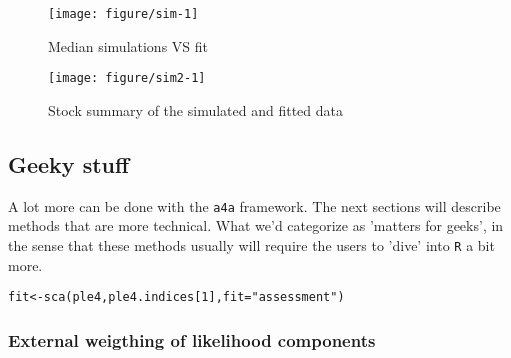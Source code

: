 \documentclass[a4paper,english,10pt]{article}\usepackage[]{graphicx}\usepackage[]{color}
\makeatletter
\def\maxwidth{ %
  \ifdim\Gin@nat@width>\linewidth
    \linewidth
  \else
    \Gin@nat@width
  \fi
}
\newcommand{\hlnum}[1]{\textcolor[rgb]{0.2,0.2,0.2}{#1}}%
\newcommand{\hlstr}[1]{\textcolor[rgb]{0.2,0.2,0.2}{#1}}%
\newcommand{\hlstd}[1]{\textcolor[rgb]{0,0,0}{#1}}%
\newcommand{\hlkwb}[1]{\textcolor[rgb]{0.361,0.506,0.596}{#1}}%
\newcommand{\hlkwc}[1]{\textcolor[rgb]{0.361,0.506,0.596}{#1}}%
\newcommand{\hlkwd}[1]{\textcolor[rgb]{0.361,0.506,0.596}{#1}}%
\newenvironment{kframe}{%
 \def\at@end@of@kframe{}%
 \ifinner\ifhmode%
  \def\at@end@of@kframe{\end{minipage}}%
  \begin{minipage}{\columnwidth}%
 \fi\fi%
 \def\FrameCommand##1{\hskip\@totalleftmargin \hskip-\fboxsep
 \colorbox{shadecolor}{##1}\hskip-\fboxsep
     \hskip-\linewidth \hskip-\@totalleftmargin \hskip\columnwidth}%
 \MakeFramed {\advance\hsize-\width
   \@totalleftmargin\z@ \linewidth\hsize
   \@setminipage}}%
 {\par\unskip\endMakeFramed%
 \at@end@of@kframe}
\newenvironment{knitrout}{}{} %
\newcommand{\initiative}[1]{{\texttt{#1}}}
\newcommand{\pkg}[1]{{\texttt{#1}}}
\makeatother
\begin{document}
\begin{knitrout}
\color{fgcolor}\begin{figure}[H]

{\centering \texttt{[image: figure/sim-1]} 

}

\caption[Median simulations VS fit]{Median simulations VS fit}\label{fig:sim}
\end{figure}


\end{knitrout}

\begin{knitrout}
\color{fgcolor}\begin{figure}[H]

{\centering \texttt{[image: figure/sim2-1]} 

}

\caption[Stock summary of the simulated and fitted data]{Stock summary of the simulated and fitted data}\label{fig:sim2}
\end{figure}


\end{knitrout}

\subsection{Geeky stuff}

A lot more can be done with the \initiative{a4a} framework. The next sections will describe methods that are more technical. What we'd categorize as 'matters for geeks', in the sense that these methods usually will require the users to 'dive' into \pkg{R} a bit more. 

\begin{knitrout}
\color{fgcolor}\begin{kframe}
\begin{alltt}
\hlstd{fit} \hlkwb{<-} \hlkwd{sca}\hlstd{(ple4, ple4.indices[}\hlnum{1}\hlstd{],} \hlkwc{fit}\hlstd{=}\hlstr{"assessment"}\hlstd{)}
\end{alltt}
\end{kframe}
\end{knitrout}

\subsubsection{External weigthing of likelihood components}
\end{document}
